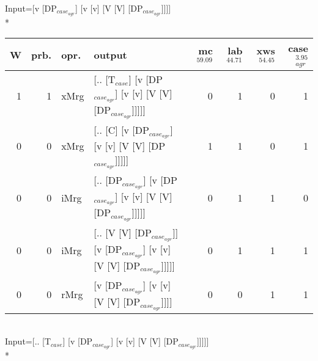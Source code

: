 \begingroup\scriptsize Input=[v [DP$_{case_{agr}}$] [v [v] [V [V] [DP$_{case_{agr}}$]]]]\\*
\begin{tabularx}{\linewidth}{rrlXrrrr}
\hline
   W &   prb. & opr.   & output                                                                     &   mc$^{59.09}$ &   lab$^{44.71}$ &   xws$^{54.45}$ &   case$_{agr}^{3.95}$ \\
\hline
   1 &   1 & xMrg & [.. [T$_{case}$] [v [DP$_{case_{agr}}$] [v [v] [V [V] [DP$_{case_{agr}}$]]]]]              &            0 &             1 &             0 &                  1 \\
   0 &   0 & xMrg & [.. [C] [v [DP$_{case_{agr}}$] [v [v] [V [V] [DP$_{case_{agr}}$]]]]]                   &            1 &             1 &             0 &                  1 \\
   0 &   0 & iMrg & [.. [DP$_{case_{agr}}$] [v [DP$_{case_{agr}}$] [v [v] [V [V] [DP$_{case_{agr}}$]]]]]         &            0 &             1 &             1 &                  0 \\
   0 &   0 & iMrg & [.. [V [V] [DP$_{case_{agr}}$]] [v [DP$_{case_{agr}}$] [v [v] [V [V] [DP$_{case_{agr}}$]]]]] &            0 &             1 &             1 &                  1 \\
   0 &   0 & rMrg & [v [DP$_{case_{agr}}$] [v [v] [V [V] [DP$_{case_{agr}}$]]]]                            &            0 &             0 &             1 &                  1 \\
\hline
\end{tabularx}\endgroup\\
\begingroup\scriptsize Input=[.. [T$_{case}$] [v [DP$_{case_{agr}}$] [v [v] [V [V] [DP$_{case_{agr}}$]]]]]\\*
